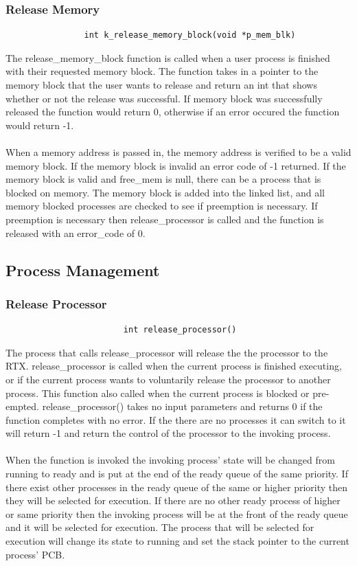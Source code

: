 \documentclass[12pt]{article}
\begin{document}
\subsubsection{Release Memory}
\begin{verbatim}
                int k_release_memory_block(void *p_mem_blk)
\end{verbatim}
The release\_memory\_block function is called when a user process is finished with their requested memory block. The function takes in a pointer to the memory block that the user wants to release and return an int that shows whether or not the release was successful. If memory block was successfully released the function would return 0, otherwise if an error occured the function would return -1. \\ \\
When a memory address is passed in, the memory address is verified to be a valid memory block. If the memory block is invalid an error code of -1 returned. If the memory block is valid and free\_mem is null, there can be a process that is blocked on memory. The memory block is added into the linked list, and all memory blocked processes are checked to see if preemption is necessary. If preemption is necessary then release\_processor is called and the function is released with an error\_code of 0. 
\subsection{Process Management}
\subsubsection{Release Processor}
\begin{verbatim}
                        int release_processor()
\end{verbatim}
The process that calls release\_processor will release the the processor to the RTX. release\_processor is called when the current process is finished executing, or if the current process wants to voluntarily release the processor to another process. This function also called when the current process is blocked or pre-empted. release\_processor() takes no input parameters and returns 0 if the function completes with no error. If the there are no processes it can switch to it will return -1 and return the control of the processor to the invoking process. \\ \\
When the function is invoked the invoking process’ state will be changed from running to ready and is put at the end of the ready queue of the same priority. If there exist other processes in the ready queue of the same or higher priority then they will be selected for execution. If there are no other ready process of higher or same priority then the invoking process will be at the front of the ready queue and it will be selected for execution. The process that will be selected for execution will change its state to running and set the stack pointer to the current process’ PCB.
\end{document}

